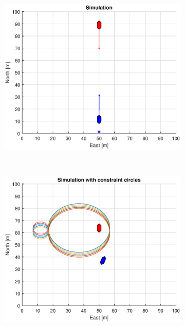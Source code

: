 \begin{figure}[!b]
\begin{subfigure}[b]{0.499\textwidth}
        \includegraphics[width=\textwidth]{Images/Figures/Enkel_HO/Simple0_f600_Frame1}
    \end{subfigure}
    \hfill
    \\
    \begin{subfigure}[b]{0.49\textwidth}
        \centering
        \includegraphics[width=\textwidth]{Images/Figures/Enkel_HO/Simple0_f1_Frame2}
    \end{subfigure}
    \hfill
    \begin{subfigure}[b]{0.499\textwidth}

\end{subfigure}
\end{figure}
